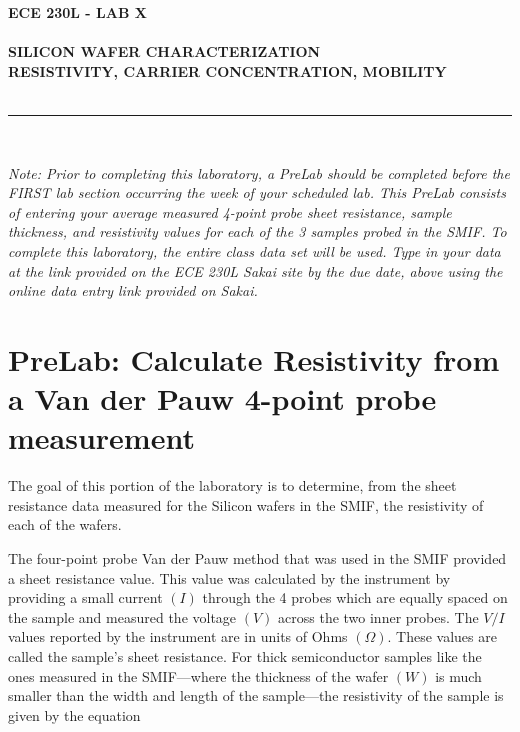 \documentclass[12pt]{../manual}
\begin{document}
\begin{center}
\textbf{\huge ECE 230L - LAB X}\\~\\
\textbf{\large SILICON WAFER CHARACTERIZATION \\
RESISTIVITY, CARRIER CONCENTRATION, MOBILITY}\\~\\
\rule{6.5in}{0.5mm}\\
\end{center}

\textit{Note: Prior to completing this laboratory, a PreLab should be completed before the FIRST lab section occurring the week of your scheduled lab.  This PreLab consists of entering your average measured 4-point probe sheet resistance, sample thickness, and resistivity values for each of the 3 samples probed in the SMIF.  To complete this laboratory, the entire class data set will be used.  Type in your data at the link provided on the ECE 230L Sakai site by the due date, above using the online data entry link provided on Sakai.}

\tableofcontents

\newpage
%
\section*{PreLab: Calculate Resistivity from a Van der Pauw 4-point probe measurement}
%
%

The goal of this portion of the laboratory is to determine, from the sheet resistance data measured for the Silicon wafers in the SMIF, the resistivity of each of the wafers.

The four-point probe Van der Pauw method that was used in the SMIF provided a sheet resistance value.  This value was calculated by the instrument by providing a small current $(I)$ through the 4 probes which are equally spaced on the sample and measured the voltage $(V)$ across the two inner probes.  The $V/I$ values reported by the instrument are in units of Ohms $(\Omega)$.  These values are called the sample's sheet resistance.  For thick semiconductor samples like the ones measured in the SMIF---where the thickness of the wafer $(W)$ is much smaller than the width and length of the sample---the resistivity of the sample is given by the equation
\end{document}
